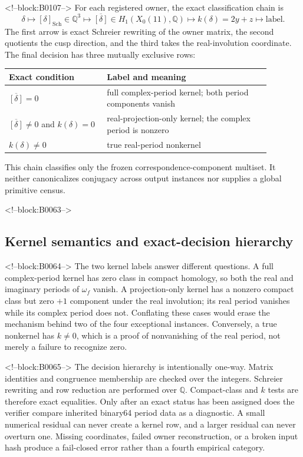 \documentclass[11pt]{article}
\theoremstyle{definition}
\theoremstyle{remark}
\newcommand{\QQ}{\mathbb Q}
\begin{document}
<!--block:B0107-->
For each registered owner, the exact classification chain is
\[
\delta
\longmapsto [\delta]_{\mathrm{Sch}}\in\QQ^3
\longmapsto \overline{[\delta]}\in H_1(X_0(11),\QQ)
\longmapsto k(\delta)=2y+z
\longmapsto \text{label}.
\]
The first arrow is exact Schreier rewriting of the owner matrix, the second quotients the cusp direction, and the third takes the real-involution coordinate. The final decision has three mutually exclusive rows:
\begin{center}
\small
\begin{tabular}{p{0.33\linewidth}p{0.55\linewidth}}
\toprule
Exact condition & Label and meaning\\
\midrule
$\overline{[\delta]}=0$ & full complex-period kernel; both period components vanish\\
$\overline{[\delta]}\neq0$ and $k(\delta)=0$ & real-projection-only kernel; the complex period is nonzero\\
$k(\delta)\neq0$ & true real-period nonkernel\\
\bottomrule
\end{tabular}
\end{center}
This chain classifies only the frozen correspondence-component multiset. It neither canonicalizes conjugacy across output instances nor supplies a global primitive census.

<!--block:B0063-->
\subsection{Kernel semantics and exact-decision hierarchy}

<!--block:B0064-->
The two kernel labels answer different questions. A full complex-period kernel has zero class in compact homology, so both the real and imaginary periods of $\omega_f$ vanish. A projection-only kernel has a nonzero compact class but zero $+1$ component under the real involution; its real period vanishes while its complex period does not. Conflating these cases would erase the mechanism behind two of the four exceptional instances. Conversely, a true nonkernel has $k\neq0$, which is a proof of nonvanishing of the real period, not merely a failure to recognize zero.

<!--block:B0065-->
The decision hierarchy is intentionally one-way. Matrix identities and congruence membership are checked over the integers. Schreier rewriting and row reduction are performed over $\QQ$. Compact-class and $k$ tests are therefore exact equalities. Only after an exact status has been assigned does the verifier compare inherited binary64 period data as a diagnostic. A small numerical residual can never create a kernel row, and a larger residual can never overturn one. Missing coordinates, failed owner reconstruction, or a broken input hash produce a fail-closed error rather than a fourth empirical category.
\end{document}
